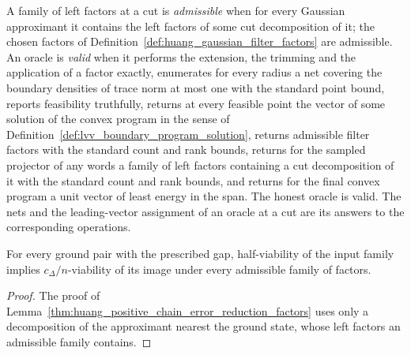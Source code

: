 \begin{definition}
    \label{def:lvv_valid_oracle}
    \leanok
    A family of left factors at a cut is \emph{admissible} when for every
    Gaussian approximant it contains the left factors of some cut decomposition
    of it; the chosen factors of
    Definition~\ref{def:huang_gaussian_filter_factors} are admissible. An
    oracle is \emph{valid} when it performs the extension, the trimming and the
    application of a factor exactly, enumerates for every radius a net covering
    the boundary densities of trace norm at most one with the standard point
    bound, reports feasibility truthfully, returns at every feasible point the
    vector of some solution of the convex program in the sense of
    Definition~\ref{def:lvv_boundary_program_solution}, returns admissible
    filter factors with the standard count and rank bounds, returns for the
    sampled projector of any words a family of left factors containing a cut
    decomposition of it with the standard count and rank bounds, and returns
    for the final convex program a unit vector of least energy in the span. The
    honest oracle is valid. The nets and the leading-vector assignment of an oracle at
    a cut are its answers to the corresponding operations.
\end{definition}

\begin{lemma}
    \label{thm:lvv_admissible_factors_viable}
    \leanok
    For every ground pair with the prescribed gap, half-viability of the input
    family implies $c_\Delta/n$-viability of its image under every admissible
    family of factors.
\end{lemma}
\begin{proof}
    \leanok
    The proof of Lemma~\ref{thm:huang_positive_chain_error_reduction_factors}
    uses only a decomposition of the approximant nearest the ground state,
    whose left factors an admissible family contains.
\end{proof}


